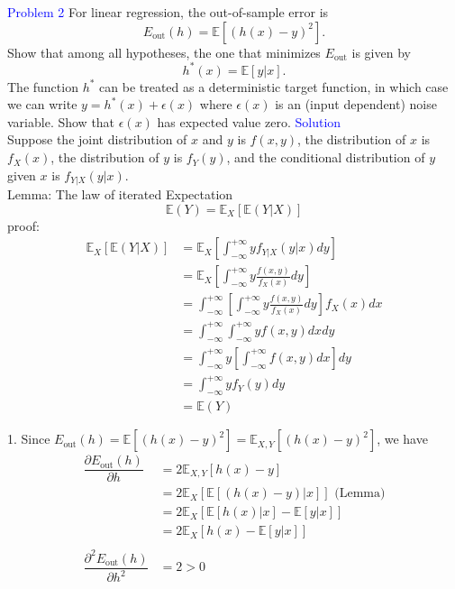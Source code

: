 \textcolor{blue}{Problem 2}
For linear regression, the out-of-sample error is 
\begin{equation}
    E_{\text{out}}(h)=\mathbb{E}[{(h(x)-y)}^2].
\end{equation}
Show that among all hypotheses, the one that minimizes $E_{\text{out}}$ is given by
\begin{equation}
    h^*(x)=\mathbb{E}[y|x].
\end{equation}
The function $h^*$ can be treated as a deterministic target function, in which case we can write $y=h^*(x)+\epsilon(x)$ where $\epsilon(x)$ is an (input dependent) noise variable. Show that $\epsilon(x)$ has expected value zero.
\newline
\textcolor{blue}{Solution}\\
Suppose the joint distribution of $x$ and $y$ is $f(x, y)$, the distribution of $x$ is $f_X(x)$, the distribution of $y$ is $f_Y(y)$, and the conditional distribution of $y$ given $x$ is $f_{Y|X}(y|x)$.\\

Lemma: The law of iterated Expectation
$$\mathbb{E}(Y)=\mathbb{E}_X[\mathbb{E}(Y|X)]$$
proof:
\begin{align*}
\mathbb{E}_X[\mathbb{E}(Y|X)] &= \mathbb{E}_X\left[\int_{-\infty}^{+\infty} y f_{Y|X}(y|x) d y\right] \\
&= \mathbb{E}_X\left[\int_{-\infty}^{+\infty} y \frac{f(x, y)}{f_X(x)} d y\right] \\
&=\int_{-\infty}^{+\infty}\left[\int_{-\infty}^{+\infty} y \frac{f(x, y)}{f_X(x)} d y\right] f_X(x) d x \\
&=\int_{-\infty}^{+\infty} \int_{-\infty}^{+\infty} y f(x, y) d x d y \\
&=\int_{-\infty}^{+\infty} y\left[\int_{-\infty}^{+\infty} f(x, y) d x\right] d y \\
&=\int_{-\infty}^{+\infty} y f_Y(y) d y \\
&=\mathbb{E}(Y)
\end{align*}

1. Since $E_{\text{out}}(h)=\mathbb{E}[{(h(x)-y)}^2]=\mathbb{E}_{X,Y}[{(h(x)-y)}^2]$, we have
\begin{align*}
    \dfrac{\partial E_{\text{out}}(h)}{\partial h} &= 2 \mathbb{E}_{X,Y}[h(x)-y] \\
    &= 2 \mathbb{E}_X\left[\mathbb{E}\left[(h(x)-y)|x\right]\right] \text{\ \ \ \ \ \ \ (Lemma)} \\
    &= 2 \mathbb{E}_X\left[\mathbb{E}\left[h(x)|x\right]-\mathbb{E}\left[y|x\right]\right] \\
    &= 2 \mathbb{E}_X\left[h(x)-\mathbb{E}\left[y|x\right]\right]\\\\
    \dfrac{\partial^2 E_{\text{out}}(h)}{\partial h^2} &= 2 > 0
\end{align*}


